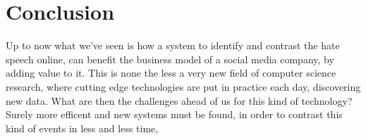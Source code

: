 \section{Conclusion}

Up to now what we've seen is how a system to identify and contrast the
hate speech online, can benefit the business model of a social media
company, by adding value to it. This is none the less a very new field
of computer science research, where cutting edge technologies are put
in practice each day, discovering new data. What are then the
challenges ahead of us for this kind of technology? Surely more
efficent and new systems must be found, in order to contrast this kind
of events in less and less time, 
